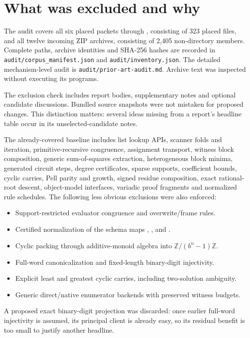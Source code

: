 \documentclass[11pt,letterpaper]{article}
\newcommand{\code}[1]{\texttt{\detokenize{#1}}}
\newcommand{\artifact}[1]{\nolinkurl{#1}}
\begin{document}
\section{What was excluded and why}

The audit covers all six placed packets \code{2026-10-26a} through
\code{2026-10-26f}, consisting of 323 placed files, and all twelve incoming
ZIP archives, consisting of 2,405 non-directory members. Complete paths,
archive identities and SHA-256 hashes are recorded in
\artifact{audit/corpus_manifest.json} and \artifact{audit/inventory.json}.
The detailed mechanism-level audit is \artifact{audit/prior-art-audit.md}.
Archive text was inspected without executing its programs.

The exclusion check includes report bodies, supplementary notes and
optional candidate discussions. Bundled source snapshots were not mistaken
for proposed changes. This distinction matters: several ideas missing
from a report's headline table occur in its unselected-candidate notes.

The already-covered baseline includes list lookup APIs, scanner folds and
iteration, primitive-recursive congruence, assignment transport, witness
block composition, generic sum-of-squares extraction, heterogeneous block
minima, generated circuit steps, degree certificates, sparse supports,
coefficient bounds, cyclic carries, Pell parity and growth, signed residue
composition, exact rational-root descent, object-model interfaces,
variadic proof fragments and normalized rule schedules. The following
less obvious exclusions were also enforced:

\begin{itemize}
\item Support-restricted evaluator congruence and overwrite/frame rules.
\item Certified normalization of the schema maps \code{rsep}, \code{rf1},
\code{rf2} and \code{ri}.
\item Cyclic packing through additive-monoid algebra into
\(\mathbb Z/(b^n-1)\mathbb Z\).
\item Full-word canonicalization and fixed-length binary-digit injectivity.
\item Explicit least and greatest cyclic carries, including two-solution ambiguity.
\item Generic direct/native enumerator backends with preserved witness budgets.
\end{itemize}

A proposed exact binary-digit projection was discarded: once earlier
full-word injectivity is assumed, its principal client is already easy,
so its residual benefit is too small to justify another headline.
\end{document}
